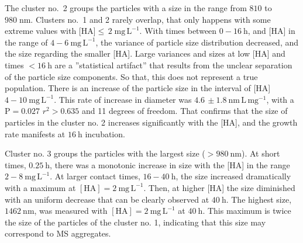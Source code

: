 \documentclass[journal=langd5,manuscript=article]{achemso}
\begin{document}
The cluster no.~2 groups the particles with a size in the range from $810$ to $980\;\mathrm{nm}$. Clusters no.~1 and 2 rarely overlap, that only happens with some extreme values with [HA]$\leq\, 2\;\mathrm{mg\,L^{-1}}$. With times between $0 -16~\mathrm{h}$, and [HA] in the range of $4 - 6~\mathrm{mg\, L^{-1}}$, the variance of particle size distribution decreased, and the size regarding the smaller [HA]. Large variances  and sizes at low [HA] and times $< 16~\mathrm{h}$ are a ''statistical artifact'' that results from the unclear separation of the particle size components. So that, this does not represent a true population. There is an increase of the particle size in the interval of [HA] $4-10~\mathrm{mg\,L^{-1}}$. This rate of increase in diameter was $4.6\,\pm 1.8~\mathrm{nm\,L\,mg^{-1}}$, with a $\mathrm{P = 0.027}$ $r^2 > 0.635$ and 11 degrees of freedom. 
% 
% 
That confirms that the size of particles in the cluster no. 2 increases significantly with the [HA], and the growth rate manifests at $16~\mathrm{h}$ incubation.



Cluster no. 3 groups the particles with the largest size ($> 980~\mathrm{nm}$).  At short times, $0.25~\mathrm{h}$, there was a monotonic increase in size with the [HA] in the range $2-8~\mathrm{mg\,L^{-1}}$. At larger contact times, $16-40~\mathrm{h}$, the size increased dramatically with a maximum at $\mathrm{[HA]} = 2~\mathrm{mg\,L^{-1}}$. Then, at higher [HA] the size  diminished with an uniform decrease that can be clearly observed at 
$40~\mathrm{h}$. The highest size, $1462~\mathrm{nm}$, was measured with $\mathrm{[HA]} = 2~\mathrm{mg\,L^{-1}}
$ at  $40~\mathrm{h}$. This maximum is twice the size of the particles of the cluster no. 1, indicating that this size may correspond to MS aggregates. 
\end{document}
